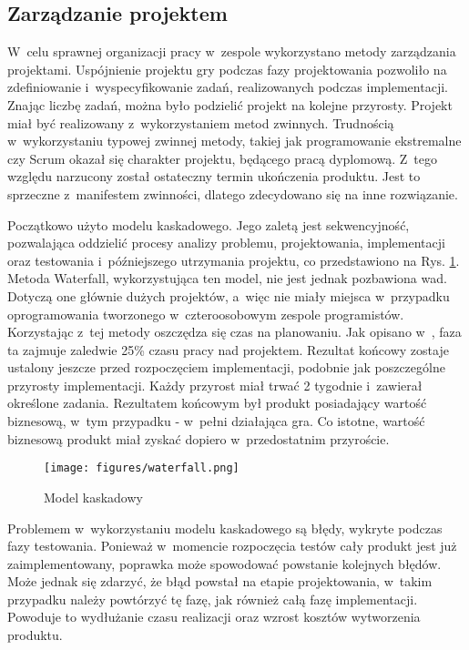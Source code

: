 \subsection{Zarządzanie projektem}
W~celu sprawnej organizacji pracy w~zespole wykorzystano metody zarządzania projektami. Uspójnienie projektu gry podczas fazy projektowania pozwoliło na zdefiniowanie i~wyspecyfikowanie zadań, realizowanych podczas implementacji. Znając liczbę zadań, można było podzielić projekt na kolejne przyrosty. Projekt miał być realizowany z~wykorzystaniem metod zwinnych. Trudnością w~wykorzystaniu typowej zwinnej metody, takiej jak programowanie ekstremalne czy Scrum okazał się charakter projektu, będącego pracą dyplomową. Z~tego względu narzucony został ostateczny termin ukończenia produktu. Jest to sprzeczne z~manifestem zwinności, dlatego zdecydowano się na inne rozwiązanie.

Początkowo użyto modelu kaskadowego. Jego zaletą jest sekwencyjność, pozwalająca oddzielić procesy analizy problemu, projektowania, implementacji oraz testowania i~późniejszego utrzymania projektu, co przedstawiono na Rys. \ref{waterfall}. Metoda Waterfall, wykorzystująca ten model, nie jest jednak pozbawiona wad. Dotyczą one głównie dużych projektów, a~więc nie miały miejsca w~przypadku oprogramowania tworzonego w~czteroosobowym zespole programistów. Korzystając z~tej metody oszczędza się czas na planowaniu. Jak opisano w~\cite{Kaczor:Scrum}, faza ta zajmuje zaledwie 25\% czasu pracy nad projektem. Rezultat końcowy zostaje ustalony jeszcze przed rozpoczęciem implementacji, podobnie jak poszczególne przyrosty implementacji. Każdy przyrost miał trwać 2 tygodnie i~zawierał określone zadania. Rezultatem końcowym był produkt posiadający wartość biznesową, w~tym przypadku - w~pełni działająca gra. Co istotne, wartość biznesową produkt miał zyskać dopiero w~przedostatnim przyroście. 

\begin{figure}
\begin{center}
\texttt{[image: figures/waterfall.png]}
\caption{Model kaskadowy}
\label{waterfall}
\end{center}
\end{figure}

Problemem w~wykorzystaniu modelu kaskadowego są błędy, wykryte podczas fazy testowania. Ponieważ w~momencie rozpoczęcia testów cały produkt jest już zaimplementowany, poprawka może spowodować powstanie kolejnych błędów. Może jednak się zdarzyć, że błąd powstał na etapie projektowania, w~takim przypadku należy powtórzyć tę fazę, jak również całą fazę implementacji. Powoduje to wydłużanie czasu realizacji oraz wzrost kosztów wytworzenia produktu.

